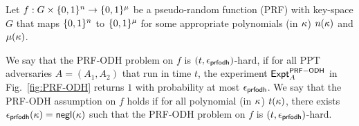 Let $f:G \times \{0,1\}^n \to \{0,1\}^{\mu}$ be a pseudo-random
function (PRF) with key-space $G$ that maps $\{0,1\}^n$ to
$\{0,1\}^{\mu}$ for some appropriate polynomials (in $\kappa$)
$n(\kappa)$ and $\mu(\kappa)$.

\begin{definition}
 We say that the PRF-ODH problem on $f$ is
 $(t, \epsilon_{\sf prfodh})$-hard, if for all PPT
 adversaries $A=(A_1,A_2)$ that run in time $t$,
 the experiment $\mathsf{Expt}^{\sf PRF-ODH}_{A}$ in
 Fig.~\ref{fig:PRF-ODH} returns $1$ with probability at
 most $\epsilon_{\sf prfodh}$.
 We say that the PRF-ODH assumption on $f$ holds if for
 all polynomial (in $\kappa$) $t(\kappa)$, there exists
 $\epsilon_{\sf prfodh}(\kappa)=\mathsf{negl}(\kappa)$ such that
 the PRF-ODH problem on $f$ is
 $(t,\epsilon_{\sf prfodh})$-hard.
\begin{figure*}[!htb]
\begin{center}
\caption{PRF-ODH security experiment}\label{fig:PRF-ODH}
\end{center}
\end{figure*}
\end{definition}


